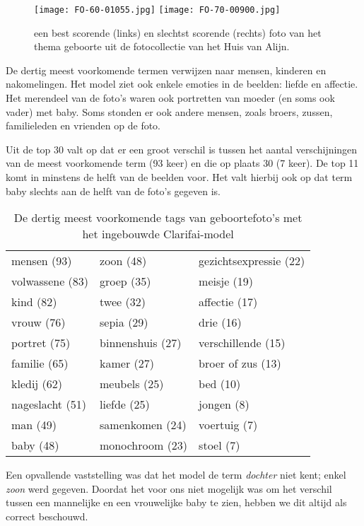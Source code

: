 \begin{figure}
	\centering
	\texttt{[image: FO-60-01055.jpg]}\hfill
	\texttt{[image: FO-70-00900.jpg]}\hfill
	\caption[Best en slechtst scorende foto van thema geboorte]{een best scorende (links) en slechtst scorende (rechts) foto van het thema geboorte uit de fotocollectie van het Huis van Alijn.}
\end{figure}

De dertig meest voorkomende termen verwijzen naar mensen, kinderen en nakomelingen. Het model ziet ook enkele emoties in de beelden: liefde en affectie. Het merendeel van de foto’s waren ook portretten van moeder (en soms ook vader) met baby. Soms stonden er ook andere mensen, zoals broers, zussen, familieleden en vrienden op de foto. 

Uit de top 30 valt op dat er een groot verschil is tussen het aantal verschijningen van de meest voorkomende term (93 keer) en die op plaats 30 (7 keer). De top 11 komt in minstens de helft van de beelden voor. Het valt hierbij ook op dat term baby slechts aan de helft van de foto’s gegeven is.

\begin{table}
	\centering
	\begin{tabular}{*{3}{l}}
		mensen (93) & zoon (48) & gezichtsexpressie (22) \\
		volwassene (83) & 	groep (35) & meisje (19) \\
		kind (82) & twee (32) & affectie (17) \\
		vrouw (76) & sepia (29) & drie (16) \\
		portret (75) & binnenshuis (27) & verschillende (15) \\
		familie (65) & 	kamer (27) & broer of zus (13) \\
		kledij (62) & 	meubels (25) & bed (10) \\
		nageslacht (51) & liefde (25) & jongen (8) \\
		man (49) & samenkomen (24) & voertuig (7) \\
		baby (48) & monochroom (23) & stoel (7) \\	
	\end{tabular}
	\caption{De dertig meest voorkomende tags van geboortefoto's met het ingebouwde Clarifai-model}
	\label{tab:30-termen-geboorte}
\end{table}

Een opvallende vaststelling was dat het model de term \textit{dochter} niet kent; enkel \textit{zoon} werd gegeven. Doordat het voor ons niet mogelijk was om het verschil tussen een mannelijke en een vrouwelijke baby te zien, hebben we dit altijd als correct beschouwd.

